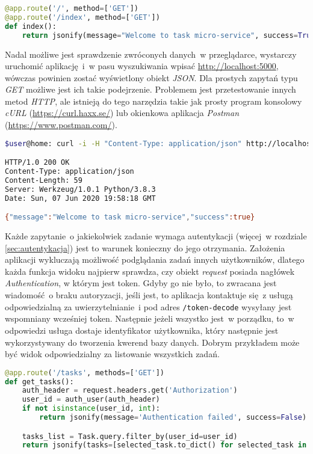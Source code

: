  \begin{lstlisting}[language=Python, caption={Funkcja \textit{index} zwracająca obiekt \textit{JSON}.}]
@app.route('/', method=['GET'])
@app.route('/index', method=['GET'])
def index():
    return jsonify(message="Welcome to task micro-service", success=True)
\end{lstlisting}

Nadal możliwe jest sprawdzenie zwróconych danych~w przeglądarce, wystarczy uruchomić aplikację~i~w pasu wyszukiwania wpisać \url{http://localhost:5000}, wówczas powinien zostać wyświetlony obiekt \textit{JSON}. Dla prostych zapytań typu \textit{GET} możliwe jest ich takie podejrzenie. Problemem jest przetestowanie innych metod \textit{HTTP}, ale istnieją do tego narzędzia takie jak prosty program konsolowy \textit{cURL} (\url{https://curl.haxx.se/}) lub okienkowa aplikacja \textit{Postman} (\url{https://www.postman.com/}).

\begin{lstlisting}[language=bash, caption={Testowe zapytanie wykonane przy pomocy programu \textit{cURL} w terminalu systemu \textit{Unix}.}]
$user@home: curl -i -H "Content-Type: application/json" http://localhost:5001/tasks

HTTP/1.0 200 OK
Content-Type: application/json
Content-Length: 59
Server: Werkzeug/1.0.1 Python/3.8.3
Date: Sun, 07 Jun 2020 19:58:18 GMT

{"message":"Welcome to task micro-service","success":true}
\end{lstlisting}

Każde zapytanie~o jakiekolwiek zadanie wymaga autentykacji (więcej~w rozdziale \ref{sec:autentykacja}) jest to warunek konieczny do jego otrzymania. Założenia aplikacji wykluczają możliwość podglądania zadań innych użytkowników, dlatego każda funkcja widoku najpierw sprawdza, czy obiekt \textit{request}\cite{flask} posiada nagłówek\cite{http} \textit{Authentication}, w którym jest token. Gdyby go nie było, to zwracana jest wiadomość~o braku autoryzacji, jeśli jest, to aplikacja kontaktuje się~z usługą odpowiedzialną za uwierzytelnianie~i pod adres \verb|/token-decode| wysyłany jest wspomniany wcześniej token. Następnie jeżeli wszystko jest~w porządku, to~w odpowiedzi usługa dostaje identyfikator użytkownika, który następnie jest wykorzystywany do tworzenia kwerend bazy danych. Dobrym przykładem może być widok odpowiedzialny za listowanie wszystkich zadań.

\begin{lstlisting}[language=Python, caption={Kod widoku odpowiedzialnego za listowanie zadań.}]
@app.route('/tasks', methods=['GET'])
def get_tasks():
    auth_header = request.headers.get('Authorization')
    user_id = auth_user(auth_header)
    if not isinstance(user_id, int):
        return jsonify(message='Authentication failed', success=False)

    tasks_list = Task.query.filter_by(user_id=user_id)
    return jsonify(tasks=[selected_task.to_dict() for selected_task in tasks_list], success=True)
\end{lstlisting}

